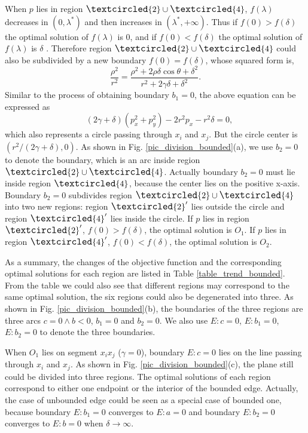 \documentclass[final,3p,times]{elsarticle}
\begin{document}
When $p$ lies in region $\large{\textcircled{\small{2}}}\cup\large{\textcircled{\small{4}}}$, $f(\lambda)$ decreases in $(0,\lambda^*)$ and then increases in $(\lambda^*,+\infty)$. Thus if $f(0)>f(\delta)$ the optimal solution of $f(\lambda)$ is 0, and if $f(0)<f(\delta)$ the optimal solution of $f(\lambda)$ is $\delta$ . Therefore region $\large{\textcircled{\small{2}}}\cup\large{\textcircled{\small{4}}}$ could also be subdivided by a new boundary $f(0)=f(\delta)$, whose squared form is,
\begin{equation*}
\frac{\rho^2}{r^2} = \frac{\rho^2+2\rho\delta\cos\theta+\delta^2}{r^2+2\gamma\delta+\delta^2}.
\end{equation*}
Similar to the process of obtaining boundary $b_1=0$, the above equation can be expressed as
\begin{equation}
\label{eq_boundary2}
\quad (2\gamma+\delta)(p_x^2+p_y^2) - 2r^2p_x - r^2\delta = 0,
\end{equation}
which also represents a circle passing through $x_i$ and $x_j$. But the circle center is $(r^2/(2\gamma+\delta),0)$. As shown in Fig. \ref{pic_division_bounded}(a), we use $b_2=0$ to denote the boundary, which is an arc inside region $\large{\textcircled{\small{2}}}\cup\large{\textcircled{\small{4}}}$. Actually boundary $b_2=0$ must lie inside region $\large{\textcircled{\small{4}}}$, because the center lies on the positive x-axis. Boundary $b_2=0$ subdivides region $\large{\textcircled{\small{2}}}\cup\large{\textcircled{\small{4}}}$ into two new regions: region $\large{\textcircled{\small{2}}}'$ lies outside the circle and region $\large{\textcircled{\small{4}}}'$ lies inside the circle. If $p$ lies in region $\large{\textcircled{\small{2}}}'$, $f(0)>f(\delta)$, the optimal solution is $O_1$. If $p$ lies in region $\large{\textcircled{\small{4}}}'$, $f(0)<f(\delta)$, the optimal solution is $O_2$.

As a summary, the changes of the objective function and the corresponding optimal solutions for each region are listed in Table \ref{table_trend_bounded}. From the table we could also see that different regions may correspond to the same optimal solution, the six regions could also be degenerated into three. As shown in Fig. \ref{pic_division_bounded}(b), the boundaries of the three regions are three arcs $c=0\wedge b<0$, $b_1=0$ and $b_2=0$. We also use $E:c=0$, $E:b_1=0$, $E:b_2=0$ to denote the three boundaries.

When $O_1$ lies on segment $x_ix_j$ ($\gamma=0$), boundary $E:c=0$ lies on the line passing through $x_i$ and $x_j$. As shown in Fig. \ref{pic_division_bounded}(c), the plane still could be divided into three regions. The optimal solutions of each region correspond to either one endpoint or the interior of the bounded edge. Actually, the case of unbounded edge could be seen as a special case of bounded one, because boundary $E:b_1=0$ converges to $E:a=0$ and boundary $E:b_2=0$ converges to $E:b=0$ when $\delta\rightarrow \infty$.
\end{document}
